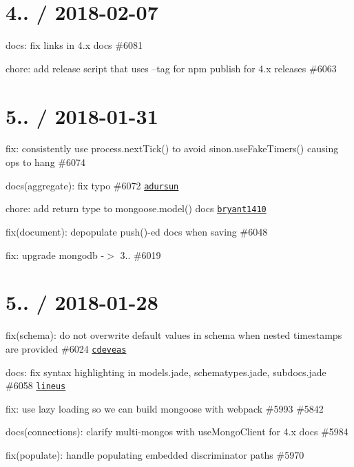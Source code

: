 \section*{4.. / 2018-\/02-\/07 }


\begin{DoxyItemize}
\item docs\+: fix links in 4.\+x docs \#6081
\item chore\+: add release script that uses --tag for npm publish for 4.\+x releases \#6063
\end{DoxyItemize}

\section*{5.. / 2018-\/01-\/31 }


\begin{DoxyItemize}
\item fix\+: consistently use process.\+next\+Tick() to avoid sinon.\+use\+Fake\+Timers() causing ops to hang \#6074
\item docs(aggregate)\+: fix typo \#6072 \href{https://github.com/adursun}{\tt adursun}
\item chore\+: add return type to {\ttfamily mongoose.\+model()} docs \href{https://github.com/bryant1410}{\tt bryant1410}
\item fix(document)\+: depopulate push()-\/ed docs when saving \#6048
\item fix\+: upgrade mongodb -\/$>$ 3.. \#6019
\end{DoxyItemize}

\section*{5.. / 2018-\/01-\/28 }


\begin{DoxyItemize}
\item fix(schema)\+: do not overwrite default values in schema when nested timestamps are provided \#6024 \href{https://github.com/cdeveas}{\tt cdeveas}
\item docs\+: fix syntax highlighting in models.\+jade, schematypes.\+jade, subdocs.\+jade \#6058 \href{https://github.com/lineus}{\tt lineus}
\item fix\+: use lazy loading so we can build mongoose with webpack \#5993 \#5842
\item docs(connections)\+: clarify multi-\/mongos with use\+Mongo\+Client for 4.\+x docs \#5984
\item fix(populate)\+: handle populating embedded discriminator paths \#5970
\end{DoxyItemize}

